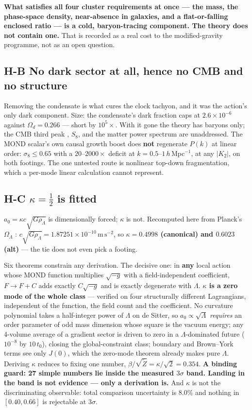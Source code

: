 \documentclass[11pt,letterpaper]{article}
\newcommand{\ms}{\,\mathrm{m\,s^{-2}}}
\begin{document}
\textbf{What satisfies all four cluster requirements at once --- the mass, the phase-space density, near-absence in galaxies, and a flat-or-falling enclosed ratio --- is a cold, baryon-tracing component. The theory does not contain one.} That is recorded as a real cost to the modified-gravity programme, not as an open question.

\subsection{H-B No dark sector at all, hence no CMB and no structure}\label{sec:HB}
Removing the condensate is what cures the clock tachyon, and it was the action's only dark component. Size: the condensate's dark fraction caps at $2.6\times10^{-6}$ against $\Omega_d=0.266$ --- short by $10^{5}\times$. With it gone the theory has baryons only; the CMB third peak \cite{planck18}, $S_8$, and the matter power spectrum are unaddressed. The MOND scalar's own causal growth boost does \textbf{not} regenerate $P(k)$ at linear order: $\sigma_8\le0.65$ with a $20$--$2000\times$ deficit at $k=0.5$--$1\,h\,$Mpc$^{-1}$, at any $|K_2|$, on both footings. The one untested route is nonlinear top-down fragmentation, which a per-mode linear calculation cannot represent.

\subsection{H-C $\kappa=\tfrac12$ is fitted}\label{sec:kappa}
$a_0=\kappa c\sqrt{G\rho_\Lambda}$ is dimensionally forced; $\kappa$ is not. Recomputed here from Planck's $\Omega_\Lambda$ \cite{planck18}: $c\sqrt{G\rho_\Lambda}=1.87251\times10^{-10}\ms$, so \textbf{$\kappa=0.4998$ (canonical) and $0.6023$ (alt)} --- the tie does not even pick a footing.

Six theorems constrain any derivation. The decisive one: in \textbf{any} local action whose MOND function multiplies $\sqrt{-g}$ with a field-independent coefficient, $F\to F+C$ adds exactly $C\sqrt{-g}$ and is exactly degenerate with $\Lambda$. \textbf{$\kappa$ is a zero mode of the whole class} --- verified on four structurally different Lagrangians, independent of the function, the field count and the coefficient. No curvature polynomial takes a half-integer power of $\Lambda$ on de Sitter, so $a_0\propto\sqrt\Lambda$ \emph{requires} an order parameter of odd mass dimension whose square is the vacuum energy; any 4-volume average of a gradient sector is driven to zero in a $\Lambda$-dominated future ($10^{-8}$ by $10\,t_0$), closing the global-constraint class; boundary and Brown--York terms see only $J(0)$, which the zero-mode theorem already makes pure $\Lambda$. Deriving $\kappa$ reduces to fixing one number, $\beta/\sqrt{\tilde Z}=\kappa/\sqrt2=0.354$. \textbf{A binding guard: 27 simple numbers lie inside the measured $3\sigma$ band. Landing in the band is not evidence --- only a derivation is.} And $\kappa$ is not the discriminating observable: total comparison uncertainty is $8.0\%$ and nothing in $[0.40,0.66]$ is rejectable at $3\sigma$.
\end{document}

